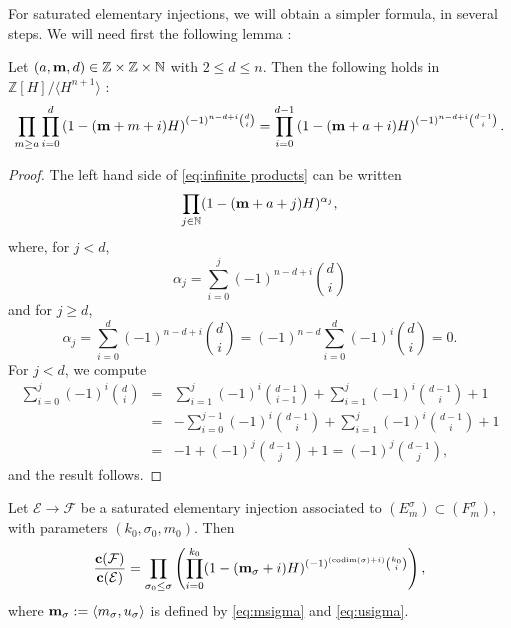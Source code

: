 \documentclass[a4paper,10pt]{amsart}
\theoremstyle{plain}{
    \newtheorem{theorem}{Theorem}[section]
    \newtheorem{lemma}[theorem]{Lemma}
    \newtheorem{corollary}[theorem]{Corollary}
    \newtheorem{proposition}[theorem]{Proposition}
    \newtheorem{conjecture}[theorem]{Conjecture}
}
\theoremstyle{definition}{
    \newtheorem{definition}[theorem]{Definition}
    \newtheorem{defn-thm}[theorem]{Definition-Theorem}
    \newtheorem{example}[theorem]{Example}
    \newtheorem{notation}[theorem]{Notation}
}
\theoremstyle{remark}{
    \newtheorem{remark}[theorem]{Remark}
    \newtheorem{problem}[theorem]{Problem}
    \newtheorem{question}[theorem]{Question}
}
\def\um{{\bf m}}
\def\uc{{\bf c}}
\def\cF{\mathcal{F}}
\def\cE{\mathcal{E}}
\def\Z{\mathbb{Z}}
\def\N{\mathbb{N}}
\def\codim{\mathrm{codim}}
\begin{document}
For saturated elementary injections, we will obtain a simpler formula, in several steps. We will need first the following lemma :
\begin{lemma}
 \label{lem:inductive formula compute ratio cherns}
 Let $(a,\um,d)\in \Z\times \Z\times \N$ with $2\leq d\leq n$. Then the following holds in $\Z[H]/\langle H^{n+1}\rangle$ :
 \begin{equation}
  \label{eq:infinite products}
  \prod_{m\geq a} \prod_{i=0}^d \left(1-(\um+m+i)H\right)^{(-1)^{n-d+i}\binom{d}{i}}=\prod_{i=0}^{d-1}\left(1-(\um+a+i)H\right)^{(-1)^{n-d+i}\binom{d-1}{i}}.
 \end{equation}
\end{lemma}
\begin{proof}
The left hand side of \eqref{eq:infinite products} can be written
$$
\prod_{j\in\N}(1-(\um+a+j)H)^{\alpha_j},
$$
where, for $j<d$,
$$
\alpha_j=\sum_{i=0}^j(-1)^{n-d+i}\binom{d}{i}
$$
and for $j\geq d$,
$$
\alpha_j=\sum_{i=0}^d(-1)^{n-d+i}\binom{d}{i}=(-1)^{n-d}\sum_{i=0}^d(-1)^{i}\binom{d}{i}=0.
$$
For $j<d$, we compute
\begin{equation*}
 \begin{array}{ccc}
 \displaystyle\sum_{i=0}^j(-1)^{i}\binom{d}{i} &=& \displaystyle \sum_{i=1}^j(-1)^{i}\binom{d-1}{i-1}+\sum_{i=1}^j(-1)^{i}\binom{d-1}{i}+1\\
                                &=&\displaystyle-\sum_{i=0}^{j-1}(-1)^{i}\binom{d-1}{i}+\sum_{i=1}^j(-1)^{i}\binom{d-1}{i}+1\\
                                &=&\displaystyle-1+(-1)^{j}\binom{d-1}{j}+1=(-1)^{j}\binom{d-1}{j},
 \end{array}
\end{equation*}
and the result follows.
\end{proof}

\begin{corollary}
 \label{prop:chern for very elementary injection}
  Let $\cE\to \cF$ be a saturated elementary injection associated to $(E^\sigma_m)\subset (F^\sigma_m)$, with parameters $(k_0,\sigma_0,m_0)$. Then
 \begin{equation}
  \label{eq:ratio chern very elementary}
  \frac{\uc(\cF)}{\uc(\cE)}=\prod_{\sigma_0\leq\sigma}\left(\prod_{i=0}^{k_0}(1-(\um_\sigma+i)H)^{(-1)^{(\codim(\sigma)+i)}\binom{k_0}{i}}\right),
 \end{equation}
 where $\um_\sigma:=\langle m_\sigma, u_\sigma\rangle$ is defined by \eqref{eq:msigma} and \eqref{eq:usigma}.
\end{corollary}
\end{document}
